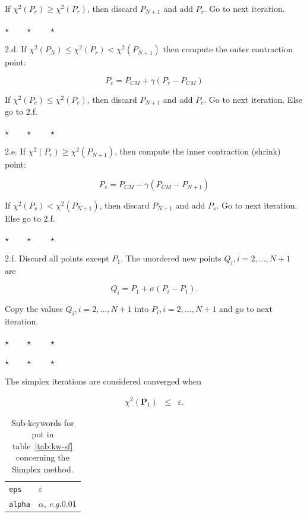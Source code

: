 \documentclass[a4paper,12pt,onecolumn]{article}
\makeatletter
\newcommand{\eg}{\emph{e.g.\@\xspace}}
\def\eps{\varepsilon}
\def\PP{\mathbf{P}}
\newcommand{\stars}{\begin{center} \vspace{0.5cm}$\star \qquad \star \qquad \star$\vspace{0.5cm}\end{center}}
\makeatother
\begin{document}
If $\chi^2(P_e) \geq \chi^2(P_r)$, then discard $P_{N+1}$ and
add $P_r$. Go to next iteration.


\stars

2.d. If $\chi^2(P_N) \leq \chi^2(P_r) < \chi^2(P_{N+1})$ then
compute the outer contraction point:

\begin{equation}
P_c = P_{CM} + \gamma (P_r - P_{CM})
\end{equation}

If $\chi^2(P_c) \leq \chi^2(P_r)$, then discard $P_{N+1}$ and
add $P_c$. Go to next iteration. Else go to 2.f.

\stars

2.e. If $\chi^2(P_r) \geq \chi^2(P_{N+1})$, then
compute the inner contraction (shrink) point:

\begin{equation}
P_s = P_{CM} - \gamma (P_{CM} - P_{N+1})
\end{equation}

If $\chi^2(P_s) < \chi^2(P_{N+1})$, then discard $P_{N+1}$ and
add $P_s$. Go to next iteration. Else go to 2.f.

\stars

2.f. Discard all points except $P_1$. The unordered new points $Q_i, i=2, \ldots, N+1$ are

\begin{equation}
Q_i = P_{1} + \sigma (P_i - P_1).
\end{equation}

Copy the values $Q_i, i=2,\ldots,N+1$ into $P_i, i=2,\ldots,N+1$ and go to next iteration.



\stars
\stars

The simplex iterations are considered converged when

\begin{eqnarray}
\chi^2(\PP_1) & \leq & \eps.
\end{eqnarray}



\begin{table}[!h]
\caption{
Sub-keywords for \textrm{pot} in table~\ref{tab:kw-sf}
concerning the Simplex method.
\label{tab:kw-s}
}
\begin{center}
\begin{tabular}{|l|l|}
\hline
\hline
\verb+eps+         & $\eps$ \\
\verb+alpha+       & $\alpha$, \eg 0.01 \\
\hline
\hline
\end{tabular}
\end{center}
\end{table}
\end{document}
